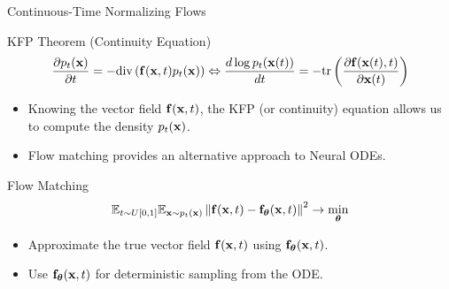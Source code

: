 \documentclass{beamer}
\begin{document}
\begin{frame}{Continuous-Time Normalizing Flows}
	\begin{block}{KFP Theorem (Continuity Equation)}
		\vspace{-0.5cm}
		\[
			\frac{\partial p_t(\mathbf{x})}{\partial t} = - \text{div}\left(\mathbf{f}(\mathbf{x}, t) p_t(\mathbf{x})\right) \Leftrightarrow \frac{d \log p_t(\mathbf{x}(t))}{d t} = - \text{tr} \left( \frac{\partial \mathbf{f}(\mathbf{x}(t), t)}{\partial \mathbf{x}(t)} \right)
		\]
		\vspace{-0.3cm}
	\end{block}
	\begin{itemize}
		\item Knowing the vector field $\mathbf{f} (\mathbf{x}, t)$, the KFP (or continuity) equation allows us to compute the density $p_t(\mathbf{x})$.
		\item Flow matching provides an alternative approach to Neural ODEs.
	\end{itemize}
	\begin{block}{Flow Matching}
		\vspace{-0.3cm}
		\[
			\mathbb{E}_{t \sim U[0, 1]} \mathbb{E}_{\mathbf{x} \sim p_t(\mathbf{x})}\left\| \mathbf{f}(\mathbf{x}, t) - \mathbf{f}_{\boldsymbol{\theta}}(\mathbf{x}, t) \right\|^2 \rightarrow \min_{\boldsymbol{\theta}}
		\]
		\vspace{-0.3cm}
	\end{block}
	\begin{itemize}
		\item Approximate the true vector field $\mathbf{f} (\mathbf{x}, t)$ using $\mathbf{f}_{\boldsymbol{\theta}}(\mathbf{x}, t)$.
		\item Use $\mathbf{f}_{\boldsymbol{\theta}}(\mathbf{x}, t)$ for deterministic sampling from the ODE.
	\end{itemize}
\end{frame}
\end{document}
